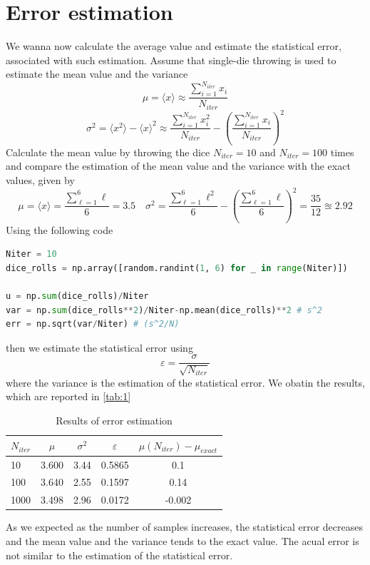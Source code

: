 \documentclass{article}
\begin{document}
\section{Error estimation}
We wanna now calculate the average value and estimate the statistical error, associated with such estimation. Assume that single-die throwing is used to estimate the mean value and the variance
\begin{equation}
    \mu=\langle x\rangle\approx\frac{\sum_{i=1}^{N_{iter}}{x_i}}{N_{iter}}
\end{equation}
\begin{equation}
    \sigma^2=\langle x^2\rangle-\langle x \rangle^2\approx\frac{\sum_{i=1}^{N_{iter}}{x_i^2}}{N_{iter}}-\left(\frac{\sum_{i=1}^{N_{iter}}{x_i}}{N_{iter}}\right)^2
\end{equation}
Calculate the mean value by throwing the dice $N_{iter}=10$ and $N_{iter}=100$ times and compare the estimation of the mean value and the variance with the exact values, given by
\begin{equation*}
    \mu=\langle x\rangle=\frac{\sum_{\ell=1}^{6}{\ell}}{6}=3.5\quad \sigma^2=\frac{\sum_{\ell=1}^{6}{\ell^2}}{6}-\left(\frac{\sum_{\ell=1}^{6}{\ell}}{6}\right)^2=\frac{35}{12}\approxeq2.92
\end{equation*}
Using the following code
\begin{lstlisting}[language=Python]
Niter = 10
dice_rolls = np.array([random.randint(1, 6) for _ in range(Niter)])

u = np.sum(dice_rolls)/Niter
var = np.sum(dice_rolls**2)/Niter-np.mean(dice_rolls)**2 # s^2
err = np.sqrt(var/Niter) # (s^2/N)
\end{lstlisting}
then we estimate the statistical error using
\begin{equation}
    \varepsilon=\frac\sigma{\sqrt{N_{iter}}}
\end{equation}
where the variance is the estimation of the statistical error. We obatin the results, which are reported in \autoref{tab:1}
\begin{table}[H]
    \centering
    \begin{tabular}{|l|c|c|c|c|}
        \hline $N_{iter}$  & $\mu$ & $\sigma^2$ &  $\varepsilon $ & $\mu(N_{iter})-\mu_{exact}$\\\hline\hline
        10 & 3.600 & 3.44 & 0.5865 & 0.1\\\hline
        100 & 3.640 & 2.55 & 0.1597 & 0.14\\\hline
        1000 & 3.498 & 2.96 & 0.0172 & -0.002\\\hline
    \end{tabular}
    \caption{Results of error estimation}
    \label{tab:1}
\end{table}
\noindent As we expected as the number of samples increases, the statistical error decreases and the mean value and the variance tends to the exact value. The acual error is not similar to the estimation of the statistical error.
\end{document}
